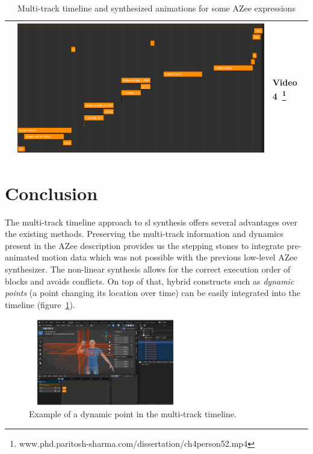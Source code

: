 \documentclass[../../main.tex]{subfiles}
\begin{document}
\begin{table}[H]
\begin{tabular}{|c|p{4.5cm}|p{2cm}|}
{        } & \includegraphics[width=\linewidth]{chapters/multi_track/images/result_ch4_persone_age_52_timeline.png} & Video 4~\footnote{www.phd.paritosh-sharma.com/dissertation/ch4person52.mp4} \\
        \hline
    \end{tabular}
    \caption{Multi-track timeline and synthesized animations for some AZee expressions}
    \label{tab:azee_to_blender}
\end{table}

\section{Conclusion}
\label{ch:multi_track:conclusion}

The multi-track timeline approach to \gls{sl} synthesis offers several advantages over the existing methods. Preserving the multi-track information and dynamics present in the AZee description provides us the stepping stones to integrate pre-animated motion data which was not possible with the previous low-level AZee synthesizer. The non-linear synthesis allows for the correct execution order of blocks and avoids conflicts. On top of that, hybrid constructs such as \emph{dynamic points} (a point changing its location over time) can be easily integrated into the timeline (figure~\ref{fig:dynpoint_example}).

\begin{figure}[h]
    \centering
    \includegraphics[width=0.6\textwidth]{chapters/multi_track/images/dynpoint_example.png}
    \caption{Example of a dynamic point in the multi-track timeline.}
    \label{fig:dynpoint_example}
\end{figure}
\end{document}
